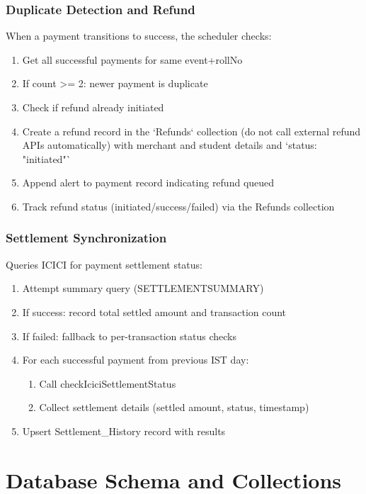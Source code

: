 \documentclass[12pt,a4paper]{article}
\begin{document}
\subsubsection{Duplicate Detection and Refund}
When a payment transitions to success, the scheduler checks:
\begin{enumerate}
  \item Get all successful payments for same event+rollNo
  \item If count >= 2: newer payment is duplicate
  \item Check if refund already initiated
  \item Create a refund record in the `Refunds` collection (do not call external refund APIs automatically) with merchant and student details and `status: "initiated"`
  \item Append alert to payment record indicating refund queued
  \item Track refund status (initiated/success/failed) via the Refunds collection
\end{enumerate}

\subsubsection{Settlement Synchronization}
Queries ICICI for payment settlement status:
\begin{enumerate}
  \item Attempt summary query (SETTLEMENTSUMMARY)
  \item If success: record total settled amount and transaction count
  \item If failed: fallback to per-transaction status checks
  \item For each successful payment from previous IST day:
    \begin{enumerate}
      \item Call checkIciciSettlementStatus
      \item Collect settlement details (settled amount, status, timestamp)
    \end{enumerate}
  \item Upsert Settlement\_History record with results
\end{enumerate}

\section{Database Schema and Collections}
\end{document}
